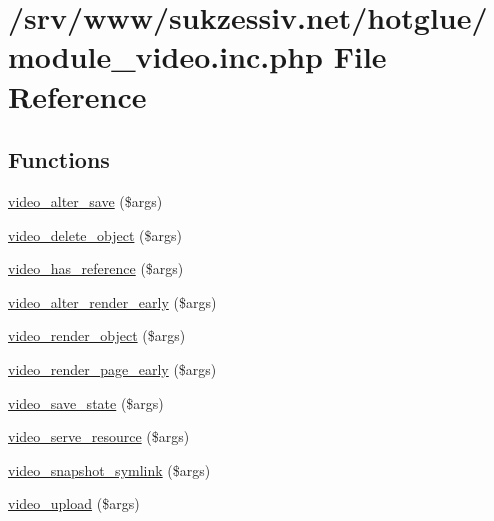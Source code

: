\hypertarget{module__video_8inc_8php}{
\section{/srv/www/sukzessiv.net/hotglue/module\_\-video.inc.php File Reference}
\label{module__video_8inc_8php}
}
\subsection*{Functions}
\begin{DoxyCompactItemize}
\item 
\hyperlink{module__video_8inc_8php_a0e3433d55c8d20b28c95a757740982e1}{video\_\-alter\_\-save} (\$args)
\item 
\hyperlink{module__video_8inc_8php_a4d25a132251840ed2ade27b636a6694e}{video\_\-delete\_\-object} (\$args)
\item 
\hyperlink{module__video_8inc_8php_adbbede5e492ca7b9457deaf076c887b0}{video\_\-has\_\-reference} (\$args)
\item 
\hyperlink{module__video_8inc_8php_acb94c1f22db7bb3aada14237fa83f4dd}{video\_\-alter\_\-render\_\-early} (\$args)
\item 
\hyperlink{module__video_8inc_8php_a14d6bc200a41905ad201a24d9a2d9be5}{video\_\-render\_\-object} (\$args)
\item 
\hyperlink{module__video_8inc_8php_a223ac9bac4acfb2c9b458b43e45e06e3}{video\_\-render\_\-page\_\-early} (\$args)
\item 
\hyperlink{module__video_8inc_8php_a828b4f740b870b886936a22baf97418e}{video\_\-save\_\-state} (\$args)
\item 
\hyperlink{module__video_8inc_8php_a5af838d3c4206bbc9bc3b5e57b16655c}{video\_\-serve\_\-resource} (\$args)
\item 
\hyperlink{module__video_8inc_8php_a53066561348413ee1021d257ae724983}{video\_\-snapshot\_\-symlink} (\$args)
\item 
\hyperlink{module__video_8inc_8php_a6ab50ffd184d8dcf84a9783dd6a2f80e}{video\_\-upload} (\$args)
\end{DoxyCompactItemize}


